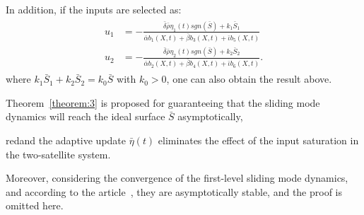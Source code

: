 \begin{remark}
In addition, if the inputs are selected as:
\begin{align}
\begin{split}
u_1 &= -\frac{\bar\delta\bar\rho\eta_1(t)sgn(\bar S)+k_1\bar S_1}{\bar\alpha b_1(X,t) + \bar\beta b_3(X,t) + \bar\iota b_5(X,t)}\\
u_2 &= -\frac{\bar\delta\bar\rho\eta_2(t)sgn(\bar S)+k_2\bar S_2}{\bar\alpha b_2(X,t) + \bar\beta b_4(X,t) + \bar\iota b_6(X,t)}.
\end{split}\label{eq:modified_u1u2}
\end{align}
where $k_1\bar S_1+k_2\bar S_2=k_0\bar S$ with $k_0>0$, one can also obtain the result above.
\end{remark}
\begin{remark}
Theorem~\ref{theorem:3} is proposed for guaranteeing that the sliding mode dynamics will reach the ideal surface $\bar S$ asymptotically, \begin{color}{red}and the adaptive update ${\bar\eta}(t)$ eliminates the effect of the input saturation in the two-satellite system.\end{color} Moreover, considering the convergence of the first-level sliding mode dynamics, and according to the article~\cite{wang2004design}, they are asymptotically stable, and the proof is omitted here.
\end{remark}
